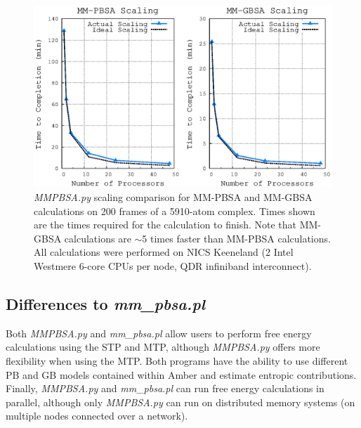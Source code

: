 \begin{figure}
   \includegraphics[width=6.5in]{MMPBSA_Scaling.eps}
   \caption{\emph{MMPBSA.py} scaling comparison for MM-PBSA and MM-GBSA
            calculations on 200 frames of a 5910-atom complex. Times shown are
            the times required for the calculation to finish. Note that MM-GBSA
            calculations are $\sim$5 times faster than MM-PBSA calculations. All
            calculations were performed on NICS Keeneland (2 Intel Westmere
            6-core CPUs per node, QDR infiniband interconnect).}
   \label{fig6:MMPBSA_Scaling}
\end{figure}

\subsection{Differences to \emph{mm\_pbsa.pl}}

Both \emph{MMPBSA.py} and \emph{mm\_pbsa.pl} allow users to perform free energy
calculations using the STP and MTP, although \emph{MMPBSA.py} offers more
flexibility when using the MTP. Both programs have the ability to use different
PB and GB models contained within Amber and estimate entropic contributions.
Finally, \emph{MMPBSA.py} and \emph{mm\_pbsa.pl} can run free energy
calculations in parallel, although only \emph{MMPBSA.py} can run on distributed
memory systems (\ie on multiple nodes connected over a network).

